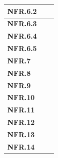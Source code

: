 \documentclass[10pt,a4paper]{article}
\newcommand{\nfr}[1]{\textcolor{reqColor}{\textbf{NFR.#1}}}
\begin{document}
\begin{longtable}[H]{| p{2.3cm} | p{2.7cm} | p{7cm}|}
  \hline \nfr{6.2}  & & \\
  \hline \nfr{6.3}  & & \\
  \hline \nfr{6.4}  & & \\
  \hline \nfr{6.5}  & & \\
  \hline \nfr{7}    & & \\
  \hline \nfr{8}    & & \\
  \hline \nfr{9}    & & \\
  \hline \nfr{10}   & & \\
  \hline \nfr{11}   & & \\
  \hline \nfr{12}   & & \\
  \hline \nfr{13}   & & \\
  \hline \nfr{14}   & & \\
  \hline
\end{longtable}






\vfill


\end{document}
